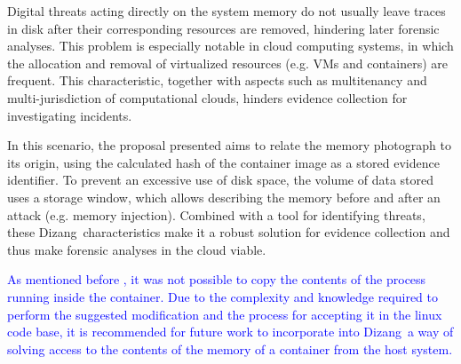 \documentclass[conference]{IEEEtran}
\newcommand{\marcos}[1]{{\color{green}{MARCOS: #1}}}
\newcommand{\fancyname}{Dizang}
\begin{document}
Digital threats acting directly on the system memory do not usually leave traces in disk after their corresponding resources are removed, hindering later forensic analyses.
%
This problem is especially notable in cloud computing systems, in which the allocation and removal of virtualized resources (e.g. VMs and containers) are frequent.
%
This characteristic, together with aspects such as multitenancy and multi-jurisdiction of computational clouds, hinders evidence collection for investigating incidents.


In this scenario, the proposal presented aims to relate the memory photograph to its origin, using the calculated hash of the container image as a stored evidence identifier.
%
To prevent an excessive use of disk space, the volume of data stored uses a storage window, which allows describing the memory before and after an attack (e.g. memory injection).
%
Combined with a tool for identifying threats, these \fancyname\ characteristics make it a robust solution for evidence collection and thus make forensic analyses in the cloud viable.
%

\textcolor{blue}{As mentioned before \marcos{Onde, cara pálida...? Tem 7 páginas antes desse ponto, então o leitor deveria caçar uma a uma?! Diga o número da seção... Isso tem a ver com a seção ``limitations''? Em caso positivo, acho que o melhor é mover o conteúdo daquela seção pra cá de uma vez: como comentei por lá, fica mais interessante deixar aquele texto como ``future work'' do que como ``limitation''}, it was not possible to copy the contents of the process running inside the container.
%
Due to the complexity and knowledge required to perform the suggested modification and the process for accepting it in the linux code base, it is recommended for future work to incorporate into \fancyname\ a way of solving access to the contents of the memory of a container from the host system.}








\end{document}
